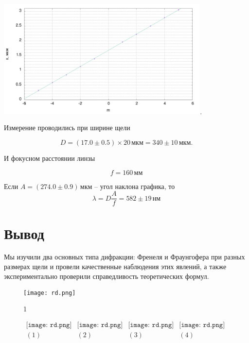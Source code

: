 \begin{center}
\includegraphics[width=0.80\textwidth]{8.png}.\\
\end{center}

Измерение проводились при ширине щели

\[D=(17.0\pm0.5)\times20\,\text{мкм}=340\pm10\,\text{мкм}.\]

И фокусном расстоянии линзы

\[f=160\,\text{мм}\]

Если $A = (274.0\pm0.9)\,\text{мкм}$ -- угол наклона графика, то
\[\lambda = D \frac{A}{f} = 582\pm19\,\text{нм}\]

\section*{Вывод}

Мы изучили два основных типа дифракции: Френеля и Фраунгофера при разных размерах щели и провели качественные наблюдения этих явлений, а также экспериментально проверили справедливость теоретических формул.  










\lipsum[1-4]
\begin{figure}
\centering
\texttt{[image: rd.png]}
\caption{1}
\end{figure}
\lipsum[1-6]


\begin{figure}[h]
\begin{center}$
\begin{array}{cccc}
\texttt{[image: rd.png]}&
\texttt{[image: rd.png]}&
\texttt{[image: rd.png]}&
\texttt{[image: rd.png]}\\
(1) & (2) & (3) & (4)
\end{array}$
\end{center}
\end{figure}
